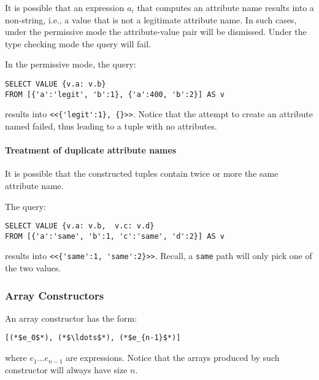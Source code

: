 It is possible that an expression $a_i$ that computes an attribute name results
into a non-string, i.e., a value that is not a legitimate attribute name. In
such cases, under the permissive mode the attribute-value pair will be
dismissed. Under the type checking mode the query will fail.

\begin{example}
In the permissive mode, the query:

\begin{lstlisting}
SELECT VALUE {v.a: v.b}
FROM [{'a':'legit', 'b':1}, {'a':400, 'b':2}] AS v
\end{lstlisting}

\noindent results into \lstinline|<<{'legit':1}, {}>>|. Notice that the attempt
to create an attribute named  failed, thus leading to a tuple with no
attributes.
\end{example}

\paragraph{Treatment of duplicate attribute names}

It is possible that the constructed tuples contain twice or more the same
attribute name. 

\begin{example}
The query:

\begin{lstlisting}
SELECT VALUE {v.a: v.b,  v.c: v.d}
FROM [{'a':'same', 'b':1, 'c':'same', 'd':2}] AS v
\end{lstlisting}

\noindent results into \lstinline|<<{'same':1, 'same':2}>>|. 
Recall, a \texttt{same} path will only pick one of the two values. 
\end{example}

\subsubsection{Array Constructors} 
\label{sec:array-constructor}

An array constructor has the form:

\begin{lstlisting}
[(*$e_0$*), (*$\ldots$*), (*$e_{n-1}$*)]
\end{lstlisting}

\noindent where $e_1 \ldots e_{n-1}$ are expressions. Notice that the arrays
produced by such constructor will always have size $n$.

